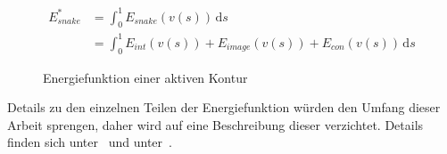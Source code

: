 \begin{figure}[H]
    \begin{align}
        E_{snake}^* & = \int_0^1 E_{snake}(v(s))\, \mathrm{d}s\\
         & = \int_0^1 E_{int}(v(s)) + E_{image}(v(s)) + E_{con}(v(s))\, \mathrm{d}s
    \end{align}
    \caption{Energiefunktion einer aktiven Kontur~\cite{kass88snakes:active}}
\end{figure}

Details zu den einzelnen Teilen der Energiefunktion würden den Umfang dieser Arbeit sprengen, daher wird auf eine Beschreibung dieser verzichtet. Details finden sich unter~\citet[S. 247]{hudritsch:script:cp} und unter~\citet[S. 323 bis 328]{kass88snakes:active}.  %
